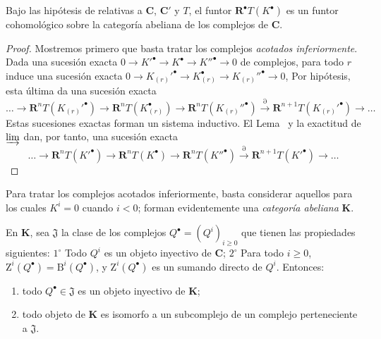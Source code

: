 \begin{proposition}[11.5.2]
\label{0.11.5.2}
\label{0.11.5.2-fr}
Bajo las hipótesis de  relativas a $\boldsymbol{C}$, $\boldsymbol{C}'$ y $T$, el funtor $\mathbf R^\bullet T(K^\bullet)$ es un funtor cohomológico sobre la categoría abeliana de los complejos de $\boldsymbol{C}$.
\end{proposition}

\begin{proof}
Mostremos primero que basta tratar los complejos \emph{acotados inferiormente}.
Dada una sucesión exacta
$0\longrightarrow K'^\bullet\longrightarrow K^\bullet\longrightarrow K''^\bullet\longrightarrow0$
de complejos, para todo $r$ induce una sucesión exacta
$0\longrightarrow K_{(r)}'^\bullet\longrightarrow K_{(r)}^\bullet\longrightarrow K_{(r)}''^\bullet\longrightarrow0$,
Por hipótesis, esta última da una sucesión exacta
\[
  \ldots\longrightarrow\mathbf R^nT(K_{(r)}'^\bullet)
  \longrightarrow\mathbf R^nT(K_{(r)}^\bullet)
  \longrightarrow\mathbf R^nT(K_{(r)}''^\bullet)
  \xrightarrow{\partial}\mathbf R^{n+1}T(K_{(r)}'^\bullet)
  \longrightarrow\ldots
\]
Estas sucesiones exactas forman un sistema inductivo.
El Lema~ y la exactitud de $\varinjlim$ dan, por tanto, una sucesión exacta
\[
  \ldots\longrightarrow\mathbf R^nT(K'^\bullet)
  \longrightarrow\mathbf R^nT(K^\bullet)
  \longrightarrow\mathbf R^nT(K''^\bullet)
  \xrightarrow{\partial}\mathbf R^{n+1}T(K'^\bullet)
  \longrightarrow\ldots
\]
\end{proof}

Para tratar los complejos acotados inferiormente, basta considerar aquellos para los cuales $K^i=0$ cuando $i<0$; forman evidentemente una \emph{categoría abeliana} $\boldsymbol{K}$.

\begin{lemma}[11.5.2.1]
\label{0.11.5.2.1}
\label{0.11.5.2.1-fr}
En $\boldsymbol{K}$, sea $\mathfrak J$ la clase de los complejos $Q^\bullet=(Q^i)_{i\geq0}$ que tienen las
propiedades siguientes: $1^\circ$ Todo $Q^i$ es un objeto inyectivo de $\boldsymbol{C}$; $2^\circ$ Para todo $i\geq0$, $\mathrm Z^i(Q^\bullet)=\mathrm B^i(Q^\bullet)$, y $\mathrm Z^i(Q^\bullet)$ es un sumando directo de $Q^i$.
Entonces:
\begin{enumerate}
  \item[{\rm(i)}] todo $Q^\bullet\in\mathfrak J$ es un objeto inyectivo de $\boldsymbol{K}$;
  \item[{\rm(ii)}] todo objeto de $\boldsymbol{K}$ es isomorfo a un subcomplejo de un complejo perteneciente a $\mathfrak J$.
\end{enumerate}
\end{lemma}

